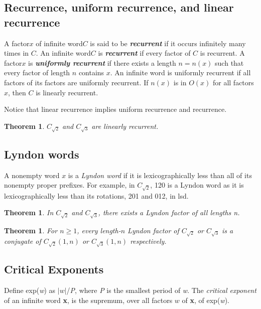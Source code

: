 \documentclass[a4paper]{article}
\newcommand{\word}{word\xspace}
\newcommand{\factor}{factor\xspace}
\newcommand{\term}[1]{\emph{\textbf{#1}}}
\newcommand{\Ctwo}{\ensuremath{C_{\sqrt{2}}}}
\newcommand{\Cthree}{\ensuremath{C_{\sqrt{3}}}}
\theoremstyle{definition}
\theoremstyle{remark}
\theoremstyle{remark}
\theoremstyle{plain}
\newtheorem{theorem}[definition]{Theorem}
\begin{document}
\subsection{Recurrence, uniform recurrence, and linear recurrence}

A \factor $x$ of infinite \word $C$ is said to be \term{recurrent} if it occurs infinitely many times in $C$. 
An infinite \word $C$ is \term{recurrent} if every factor of $C$ is recurrent. 
A \factor $x$ is \term{uniformly recurrent} if there exists a length $n = n(x)$ such that every factor of length $n$ contains $x$.
An infinite word is uniformly recurrent if all factors of its factors are uniformly recurrent.
If $n(x)$ is in $O(x)$ for all factors $x$, then $C$ is linearly recurrent. 

Notice that linear recurrence implies uniform recurrence and recurrence.

\begin{theorem}
$\Ctwo$ and $\Cthree$ are linearly recurrent. 
\end{theorem}

\subsection{Lyndon words}

A nonempty word $x$ is a \textit{Lyndon word} if it is lexicographically less than all of its nonempty proper prefixes. For example, in $C_{\sqrt{2}}$, 120 is a Lyndon word as it is lexicographically less than its rotations, 201 and 012, in lsd.

\begin{theorem}
In $C_{\sqrt{2}}$ and $C_{\sqrt{3}}$, there exists a Lyndon factor of all lengths n.
\end{theorem}

\begin{theorem}
For $n \geq 1$, every length-$n$ Lyndon factor of $C_{\sqrt{2}}$ or $C_{\sqrt{3}}$ is a conjugate of $C_{\sqrt{2}}(1, n)$ or $C_{\sqrt{3}}(1, n)$ respectively.
\end{theorem}

\subsection{Critical Exponents}
Define exp(\textit{w}) as $|\textit{w}|$/\textit{P}, where \textit{P} is the smallest period of \textit{w}. 
The \textit{critical exponent} of an infinite word \textbf{x}, is the supremum, over all factors $w$ of \textbf{x}, of exp(\textit{w}).
\end{document}
